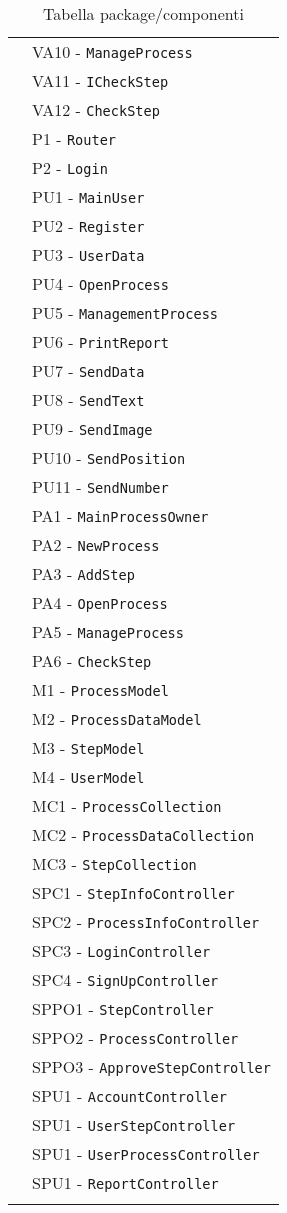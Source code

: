 \begin{longtable}{XX}
&VA10 - \texttt{ManageProcess}\\ 
&VA11 - \texttt{ICheckStep}\\ 
&VA12 - \texttt{CheckStep}\\ 
\midrule
\logic{} &P1 - \texttt{Router}\\ 
&P2 - \texttt{Login}\\ 
\logicUser{}&PU1 - \texttt{MainUser}\\ 
&PU2 - \texttt{Register}\\ 
&PU3 - \texttt{UserData}\\ 
&PU4 - \texttt{OpenProcess}\\ 
&PU5 - \texttt{ManagementProcess}\\ 
&PU6 - \texttt{PrintReport}\\ 
&PU7 - \texttt{SendData}\\ 
&PU8 - \texttt{SendText}\\ 
&PU9 - \texttt{SendImage}\\ 
&PU10 - \texttt{SendPosition}\\ 
&PU11 - \texttt{SendNumber}\\ 
\midrule
\logicAdmin{}&PA1 - \texttt{MainProcessOwner}\\
&PA2 - \texttt{NewProcess}\\ 
&PA3 - \texttt{AddStep}\\ 
&PA4 - \texttt{OpenProcess}\\ 
&PA5 - \texttt{ManageProcess}\\ 
&PA6 - \texttt{CheckStep}\\ 
\midrule
\model{}&M1 - \texttt{ProcessModel}\\
&M2 - \texttt{ProcessDataModel}\\
&M3 - \texttt{StepModel}\\
&M4 - \texttt{UserModel}\\
\midrule
\collection{}&MC1 - \texttt{{ProcessCollection}}\\
&MC2 - \texttt{{ProcessDataCollection}}\\
&MC3 - \texttt{{StepCollection}}\\
\midrule
\sCommon{}&SPC1 - \texttt{StepInfoController}\\
		&SPC2 - \texttt{ProcessInfoController}\\
		&SPC3 - \texttt{LoginController}\\
		&SPC4 - \texttt{SignUpController}\\
\midrule

\sProcessOwner{}&SPPO1 - \texttt{StepController}\\
&SPPO2 - \texttt{ProcessController}\\
&SPPO3 - \texttt{ApproveStepController}\\
\midrule
\sUser{}&SPU1 - \texttt{AccountController}\\
&SPU1 - \texttt{UserStepController}\\
&SPU1 - \texttt{UserProcessController}\\
&SPU1 - \texttt{ReportController}\\


\bottomrule
\caption{Tabella package/componenti}
\end{longtable}
